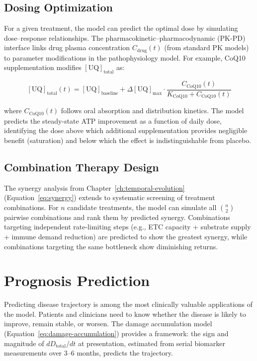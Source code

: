 \subsection{Dosing Optimization}
\label{sec:dosing-optimization}

For a given treatment, the model can predict the optimal dose by simulating dose--response relationships. The pharmacokinetic--pharmacodynamic (PK-PD) interface links drug plasma concentration $C_{\text{drug}}(t)$ (from standard PK models) to parameter modifications in the pathophysiology model. For example, CoQ10 supplementation modifies $[\text{UQ}]_{\text{total}}$ as:

\begin{equation}
\label{eq:pkpd-coq10}
[\text{UQ}]_{\text{total}}(t) = [\text{UQ}]_{\text{baseline}} + \Delta[\text{UQ}]_{\max} \cdot \frac{C_{\text{CoQ10}}(t)}{K_{\text{CoQ10}} + C_{\text{CoQ10}}(t)}
\end{equation}

where $C_{\text{CoQ10}}(t)$ follows oral absorption and distribution kinetics. The model predicts the steady-state ATP improvement as a function of daily dose, identifying the dose above which additional supplementation provides negligible benefit (saturation) and below which the effect is indistinguishable from placebo.

\subsection{Combination Therapy Design}

The synergy analysis from Chapter~\ref{ch:temporal-evolution} (Equation~\ref{eq:synergy}) extends to systematic screening of treatment combinations. For $n$ candidate treatments, the model can simulate all $\binom{n}{2}$ pairwise combinations and rank them by predicted synergy. Combinations targeting independent rate-limiting steps (e.g., ETC capacity + substrate supply + immune demand reduction) are predicted to show the greatest synergy, while combinations targeting the same bottleneck show diminishing returns.

\section{Prognosis Prediction}
\label{sec:prognosis-prediction}

Predicting disease trajectory is among the most clinically valuable applications of the model. Patients and clinicians need to know whether the disease is likely to improve, remain stable, or worsen. The damage accumulation model (Equation~\ref{eq:damage-accumulation}) provides a framework: the sign and magnitude of $dD_{\text{total}}/dt$ at presentation, estimated from serial biomarker measurements over 3--6 months, predicts the trajectory.

